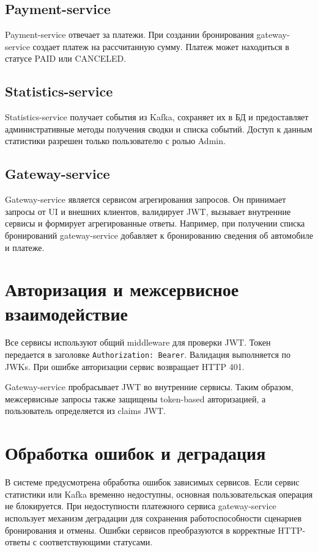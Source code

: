 \subsection{Payment-service}

Payment-service отвечает за платежи. При создании бронирования gateway-service создает платеж на рассчитанную сумму. Платеж может находиться в статусе PAID или CANCELED.

\subsection{Statistics-service}

Statistics-service получает события из Kafka, сохраняет их в БД и предоставляет административные методы получения сводки и списка событий. Доступ к данным статистики разрешен только пользователю с ролью Admin.

\subsection{Gateway-service}

Gateway-service является сервисом агрегирования запросов. Он принимает запросы от UI и внешних клиентов, валидирует JWT, вызывает внутренние сервисы и формирует агрегированные ответы. Например, при получении списка бронирований gateway-service добавляет к бронированию сведения об автомобиле и платеже.

\section{Авторизация и межсервисное взаимодействие}

Все сервисы используют общий middleware для проверки JWT. Токен передается в заголовке \texttt{Authorization: Bearer}. Валидация выполняется по JWKs. При ошибке авторизации сервис возвращает HTTP 401.

Gateway-service пробрасывает JWT во внутренние сервисы. Таким образом, межсервисные запросы также защищены token-based авторизацией, а пользователь определяется из claims JWT.

\section{Обработка ошибок и деградация}

В системе предусмотрена обработка ошибок зависимых сервисов. Если сервис статистики или Kafka временно недоступны, основная пользовательская операция не блокируется. При недоступности платежного сервиса gateway-service использует механизм деградации для сохранения работоспособности сценариев бронирования и отмены. Ошибки сервисов преобразуются в корректные HTTP-ответы с соответствующими статусами.

